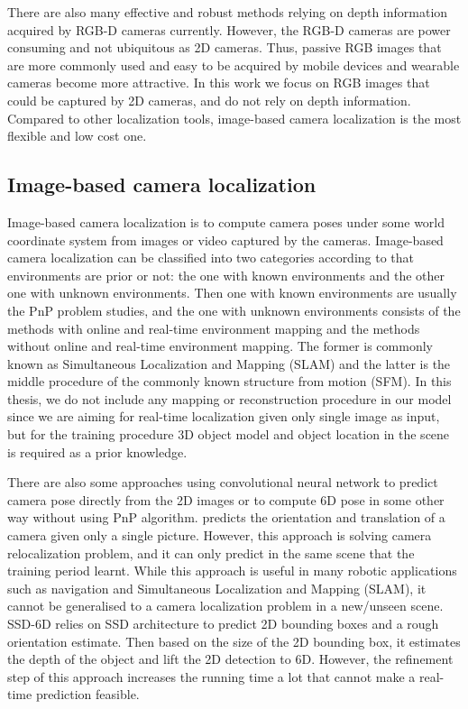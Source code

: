 There are also many effective and robust methods relying on depth information acquired by RGB-D cameras currently. However, the RGB-D cameras are power consuming and not ubiquitous as 2D cameras. Thus, passive RGB images that are more commonly used and easy to be acquired by mobile devices and wearable cameras become more attractive. In this work we focus on RGB images that could be captured by 2D cameras, and do not rely on depth information. Compared to other localization tools, image-based camera localization is the most flexible and low cost one.

\subsection{Image-based camera localization}

Image-based camera localization \cite{wu2018image} is to compute camera poses under some world coordinate system from images or video captured by the cameras. Image-based camera localization can be classified into two categories according to that environments are prior or not: the one with known environments and the other one with unknown environments. Then one with known environments are usually the PnP problem studies, and the one with unknown environments consists of the methods with online and real-time environment mapping and the methods without online and real-time environment mapping. The former is commonly known as Simultaneous Localization and Mapping (SLAM) and the latter is the middle procedure of the commonly known structure from motion (SFM). In this thesis, we do not include any mapping or reconstruction procedure in our model since we are aiming for real-time localization given only single image as input, but for the training procedure 3D object model and object location in the scene is required as a prior knowledge.

There are also some approaches using convolutional neural network to predict camera pose directly from the 2D images or to compute 6D pose in some other way without using PnP algorithm. \cite{wu2017delving} predicts the orientation and translation of a camera given only a single picture. However, this approach is solving camera relocalization problem, and it can only predict in the same scene that the training period learnt. While this approach is useful in many robotic applications such as navigation and Simultaneous Localization and Mapping (SLAM), it cannot be generalised to a camera localization problem in a new/unseen scene. SSD-6D \cite{kehl2017ssd} relies on SSD architecture to predict 2D bounding boxes and a rough orientation estimate. Then based on the size of the 2D bounding box, it estimates the depth of the object and lift the 2D detection to 6D. However, the refinement step of this approach increases the running time a lot that cannot make a real-time prediction feasible.

